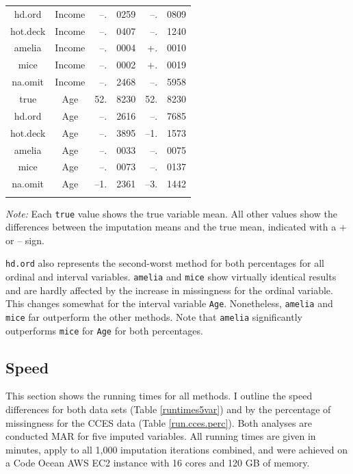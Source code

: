 \documentclass[12pt,econ]{sources/authesis}
\begin{document}
\begin{table}[!htbp]
\begin{threeparttable}
\begin{tabular}{ccr@{}lr@{}l}
 hd.ord & Income & --.&0259 & --.&0809 \\
 hot.deck & Income & --.&0407 & --.&1240 \\
 amelia & Income & --.&0004 & +.&0010 \\
 mice & Income & --.&0002 & +.&0019 \\
 na.omit & Income & --.&2468 & --.&5958 \\
 true & Age & 52.&8230 & 52.&8230 \\ 
 hd.ord & Age & --.&2616 & --.&7685 \\
 hot.deck & Age & --.&3895 & --1.&1573 \\ 
 amelia & Age & --.&0033 & --.&0075 \\
 mice & Age & --.&0073 & --.&0137 \\
 na.omit & Age & --1.&2361 & --3.&1442 \\
 \hline \\[-1.8ex]  
\end{tabular} 
\begin{tablenotes}
\footnotesize{\textit{Note:} Each \texttt{true} value shows the true variable mean. All other values show the differences between the imputation means and the true mean, indicated with a + or -- sign.}
\end{tablenotes}
\end{threeparttable}
\end{table}
\texttt{hd.ord} also represents the second-worst method for both percentages for all ordinal and interval variables.
\texttt{amelia} and \texttt{mice} show virtually identical results and are hardly affected by the increase in missingness for the ordinal variable. This changes somewhat for the interval variable \texttt{Age}. Nonetheless, \texttt{amelia} and \texttt{mice} far outperform the other methods. Note that \texttt{amelia} significantly outperforms \texttt{mice} for \texttt{Age} for both percentages.

\hypertarget{ordmiss-results-speed}{%
\subsection{Speed}\label{ordmiss-results-speed}}

This section shows the running times for all methods. I outline the speed differences for both data sets (Table \ref{runtimes5var}) and by the percentage of missingness for the CCES data (Table \ref{run.cces.perc}). Both analyses are conducted MAR for five imputed variables. All running times are given in minutes, apply to all 1,000 imputation iterations combined, and were achieved on a Code Ocean AWS EC2 instance with 16 cores and 120 GB of memory.
\end{document}
